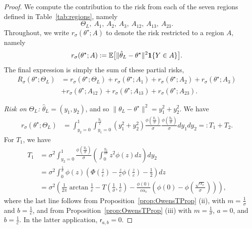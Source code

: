 \documentclass[11pt]{article}
\theoremstyle{plain}
\theoremstyle{definition}
\newcommand{\sfr}{\mathsf{r}}
\newcommand{\indicator}{{\bf{1}}}
\newcommand{\E}{\mathbb{E}}
\newcommand{\hattheta}{\hat{\theta}}
\newcommand{\inparen}[1]{\left(#1\right)}             %
\begin{document}
\begin{proof}
    We compute the contribution to the risk from each of the seven regions defined
in Table~\ref{tab:regions}, namely
\[
    \Theta_L,\ A_1,\ A_2,\ A_3,\ A_{12},\ A_{13},\ A_{23}.
\]
Throughout, we write $r_\sigma(\theta^\star; A)$ to denote the risk restricted to a region $A$, namely
\[
r_\sigma(\theta^\star; A)
:= \E\big[ \|\hattheta_L - \theta^\star\|^2 \indicator\{Y \in A\} \big].
\]
 The final expression is simply the sum of these partial risks, 
\begin{align*} R_\sigma(\theta^\star; \Theta_L) &= r_\sigma(\theta^\star; \Theta_L) + 
r_\sigma(\theta^\star; A_1) +
r_\sigma(\theta^\star; A_2) + r_\sigma(\theta^\star; A_3) \\ 
& + r_\sigma(\theta^\star; A_{12}) + r_\sigma(\theta^\star; A_{13}) + r_\sigma(\theta^\star; A_{23}). 
\end{align*} 

    \noindent
    \textit{Risk on $\Theta_L$:} $\hattheta_L = (y_1,y_2)$, and so $\|\hattheta_L - \theta^\star\|^2 = y_1^2 + y_2^2$. We have 
\begin{align*}
    r_\sigma(\theta^\star; \Theta_L)
    &=
    \int_{y_2=0}^1 \int_{y_1=0}^{\frac{y_2}{c}} 
    (y_1^2 + y_2^2)
    \frac{\phi\inparen{\frac{y_1}{\sigma}}}{\sigma} \frac{\phi\inparen{\frac{y_2}{\sigma}}}{\sigma} dy_1 dy_2 
    =: T_1+T_2.
\end{align*}
For $T_1$, we have
\begin{align*}
    T_1 &= \sigma^2 \int_{y_2=0}^1 
    \frac{\phi\inparen{\frac{y_2}{\sigma}}}{\sigma}
    \inparen{
    \int_0^{\frac{y_2}{c\sigma}} z^2 \phi(z) dz 
    } dy_2\\
    &=\sigma^2 \int_0^{\frac{1}{\sigma}} \phi(z) \inparen{\Phi\inparen{\frac{z}{c}} - \frac{z}{c} \phi\inparen{\frac{z}{c}} - \frac{1}{2}}dz\\
    &=\sigma^2 \inparen{
    \frac{1}{2\pi} \arctan \frac{1}{c}
    - T \inparen{\frac{1}{\sigma}, \frac{1}{c}} 
    - \frac{\phi(0)}{c \alpha_c} \inparen{\phi(0) - \phi \inparen{\frac{\sqrt{\alpha_c}}{\sigma}}}
    },
\end{align*}
    where the last line follows from Proposition~\ref{prop:OwensTProp} (ii), with $m=\frac1\sigma$ and $b=\frac1c$, and from 
    Proposition~\ref{prop:OwensTProp} (iii) with $m=\frac1\sigma$, $a=0$, and $b=\frac1c$. In the latter application, $\sfr_{a,b}=0$.
    

\end{proof}
\end{document}
